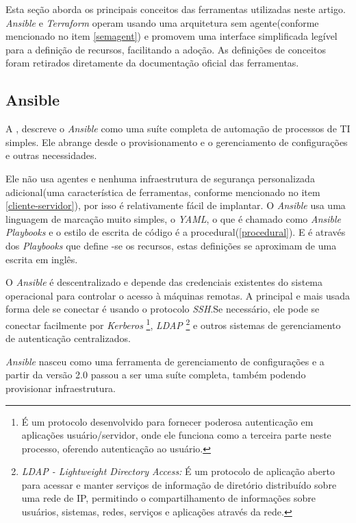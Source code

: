 Esta seção aborda os principais conceitos das ferramentas utilizadas neste artigo. \textit{Ansible} e \textit{Terraform} operam usando uma arquitetura sem agente(conforme mencionado no item \ref{semagent}) e promovem uma interface simplificada legível para a definição de recursos, facilitando a adoção. As definições de conceitos foram retirados diretamente da documentação oficial das ferramentas.

\subsection{Ansible}

A , descreve o \textit{Ansible} como uma suíte completa de automação de processos de TI simples. Ele abrange desde o provisionamento e o gerenciamento de configurações e outras necessidades.

Ele não usa agentes e nenhuma infraestrutura de segurança personalizada adicional(uma característica de ferramentas, conforme mencionado no item \ref{cliente-servidor}), por isso é relativamente fácil de implantar. O \textit{Ansible} usa uma linguagem de marcação muito simples, o \textit{YAML}, o que é chamado como \textit{Ansible Playbooks} e o estilo de escrita de código é a procedural(\ref{procedural}). E é através dos \textit{Playbooks} que define -se os recursos, estas definições se aproximam de uma escrita em inglês. 

O \textit{Ansible} é descentralizado e depende das credenciais existentes do sistema operacional para controlar o acesso à máquinas remotas. A principal e mais usada forma dele se conectar é usando o protocolo \textit{SSH}.Se necessário, ele pode se conectar facilmente por \textit{Kerberos} \footnote{É um protocolo desenvolvido para fornecer poderosa autenticação em aplicações usuário/servidor, onde ele funciona como a terceira parte neste processo, oferendo autenticação ao usuário.}, \textit{LDAP} \footnote{\textit{LDAP - Lightweight Directory Access:} É um protocolo de aplicação aberto para acessar e manter serviços de informação de diretório distribuído sobre uma rede de IP, permitindo o compartilhamento de informações sobre usuários, sistemas, redes, serviços e aplicações através da rede.} e outros sistemas de gerenciamento de autenticação centralizados.


\textit{Ansible} nasceu como uma ferramenta de gerenciamento de configurações e a partir da versão 2.0 passou a ser uma suíte completa, também podendo provisionar infraestrutura.

